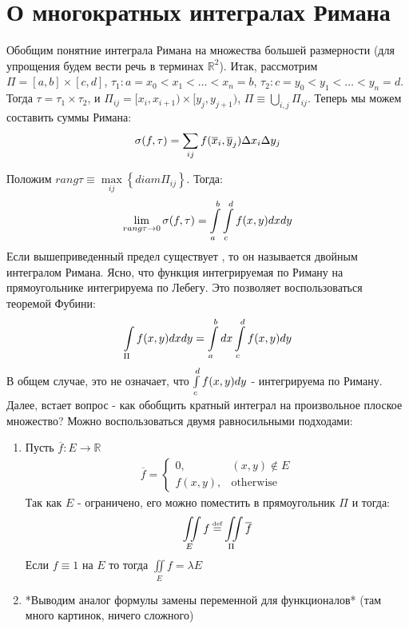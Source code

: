 \section{О многократных интегралах Римана}

Обобщим понятние интеграла Римана на множества большей размерности 
(для упрощения будем вести речь в терминах $\mathbb{R}^2$).
Итак, рассмотрим $\Pi = [a, b] \times [c, d]$, $\tau_1 : a = x_0 < x_1 < \dots < x_n = b$, 
$\tau_2 : c = y_0 < y_1 < \dots < y_n = d$. 
Тогда $\tau = \tau_1 \times \tau_2$, и 
$\Pi_{ij} = [x_i, x_{i + 1}) \times [y_j, y_{j + 1})$, $\Pi \equiv \bigcup\limits_{i, j} \Pi_{ij}$.
Теперь мы можем составить суммы Римана:
\begin{gather*}
	\sigma(f, \tau) = \sum\limits_{ij} f(\overline{x}_i, \overline{y}_j)\Delta x_i	\Delta y_j
\end{gather*}

Положим $rang\tau \equiv \max\limits_{ij}\left\{ diam \Pi_{ij}\right\}$.
Тогда:
\begin{gather*}
	\lim\limits_{rang\tau\rightarrow 0} \sigma(f, \tau) = \int\limits_{a}^{b}\int\limits_{c}^{d}f(x, y)dxdy
\end{gather*}
Если вышеприведенный предел существует , то он называется двойным интегралом Римана. 
Ясно, что функция интегрируемая по Риману на прямоугольнике интегрируема по Лебегу. 
Это позволяет воспользоваться теоремой Фубини:
\begin{gather*}
	\int\limits_{\Pi}f(x, y)dxdy = \int\limits_{a}^{b}dx\int\limits_{c}^{d}f(x, y)dy
\end{gather*}
В общем случае, это не означает, что $\int\limits_{c}^{d}f(x, y)dy$ - интегрируема по Риману.
Далее, встает вопрос - как обобщить кратный интеграл на произвольное плоское множество?
Можно воспользоваться двумя равносильными подходами:
\begin{enumerate}
	\item 
		Пусть $\overline{f}: E \rightarrow \mathbb{R}$
		\begin{gather*}
			\overline{f} =  \left\{\begin{matrix}
				0,& (x, y) \notin E
									\\ 
										f(x, y), &\text{otherwise}
									\end{matrix}\right.
		\end{gather*}
		Так как $E$ - ограничено, его можно поместить в прямоугольник $\Pi$ и тогда:
		\begin{gather*}
			\iint\limits_{E}f \defeq \iint\limits_{\Pi} \overline{f}
		\end{gather*}
		Если $f \equiv 1$ на $E$ то тогда
		$\iint\limits_{E}f = \lambda E$
	\item
		*Выводим аналог формулы замены переменной для функционалов* \todo (там много картинок, ничего
		сложного)
\end{enumerate}

